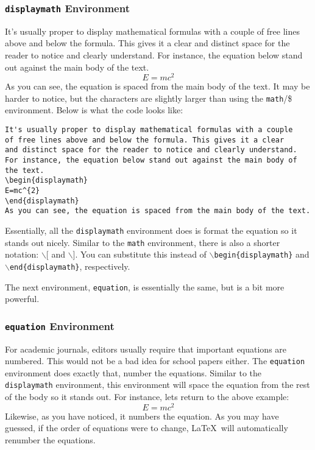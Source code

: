 \documentclass{article}
\begin{document}
\subsubsection{\texttt{displaymath} Environment}

It's usually proper to display mathematical formulas with a couple of free lines above and below the formula. This gives it a clear and distinct space for the reader to notice and clearly understand. For instance, the equation below stand out against the main body of the text.
\begin{displaymath}
E=mc^{2}
\end{displaymath}
As you can see, the equation is spaced from the main body of the text. It may be harder to notice, but the characters are slightly larger than using the \texttt{math}/\$ environment. Below is what the code looks like:
\begin{verbatim}
It's usually proper to display mathematical formulas with a couple 
of free lines above and below the formula. This gives it a clear 
and distinct space for the reader to notice and clearly understand. 
For instance, the equation below stand out against the main body of the text.
\begin{displaymath}
E=mc^{2}
\end{displaymath}
As you can see, the equation is spaced from the main body of the text.
\end{verbatim}
Essentially, all the \texttt{displaymath} environment does is format the equation so it stands out nicely. Similar to the \texttt{math} environment, there is also a shorter notation: $\backslash$[ and $\backslash$]. You can substitute this instead of \texttt{$\backslash$begin\{displaymath\}} and \texttt{$\backslash$end\{displaymath\}}, respectively.

The next environment, \texttt{equation}, is essentially the same, but is a bit more powerful.

\subsubsection{\texttt{equation} Environment}

For academic journals, editors usually require that important equations are numbered. This would not be a bad idea for school papers either. The \texttt{equation} environment does exactly that, number the equations. Similar to the \texttt{displaymath} environment, this environment will space the equation from the rest of the body so it stands out. For instance, lets return to the above example:
\begin{equation}\label{eq:relativity}
E=mc^{2}
\end{equation}
Likewise, as you have noticed, it numbers the equation. As you may have guessed, if the order of equations were to change, \LaTeX\ will automatically renumber the equations.
\end{document}

